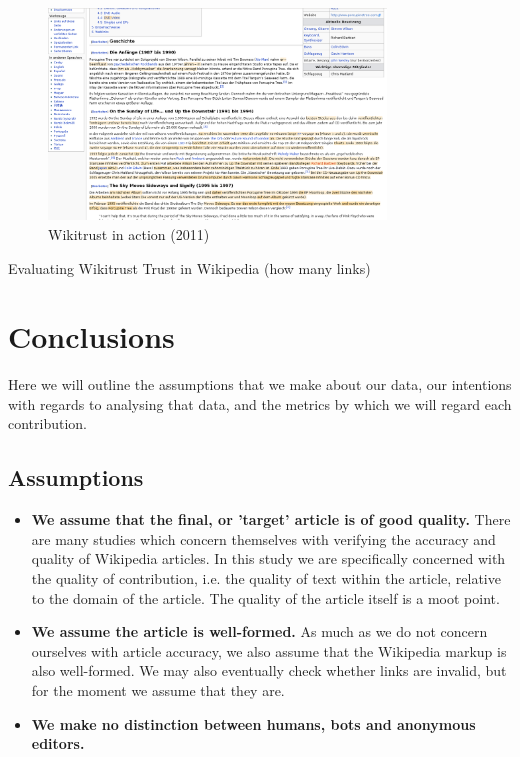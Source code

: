\documentclass[a4paper,11pt,twoside,notitlepage]{article}
\begin{document}
       \begin{figure}
         \centering
         \includegraphics[width=0.8\textwidth,clip=true,resolution=300]{img/wikitrust.png}
         \caption{Wikitrust in action (2011)}
         \label{fig:wikitrust}
       \end{figure}

       \cite{Lucassen2011} Evaluating Wikitrust
       \cite{Lucassen2010} Trust in Wikipedia (how many links)
       



        \section{Conclusions}
        Here we will outline the assumptions that we make about our
        data, our intentions with regards to analysing that data, and
        the metrics by which we will regard each contribution.

        \subsection*{Assumptions}
        \begin{itemize}
          \item \textbf{We assume that the final, or 'target' article
            is of good quality.} There are many studies which concern
            themselves with verifying the accuracy and quality of
            Wikipedia articles. In this study we are specifically
            concerned with the quality of contribution, i.e. the
            quality of text within the article, relative to the domain
            of the article. The quality of the article itself is a
            moot point.
          \item \textbf{We assume the article is well-formed.} As much
            as we do not concern ourselves with article accuracy, we
            also assume that the Wikipedia markup is also
            well-formed. We may also eventually check whether links
            are invalid, but for the moment we assume that they are.
          \item \textbf{We make no distinction between humans, bots
            and anonymous editors.}
        \end{itemize}
        
\end{document}

